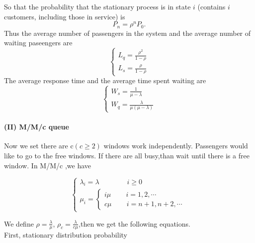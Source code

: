 \documentclass{mcmthesis}
\begin{document}
			So that the probability that the stationary process is in state ${i}$ (contains ${i}$ customers, including those in service) is
			\begin{equation}
			 	P_n = \rho ^n P_0.
			\end{equation}
			Thus the average number of passengers in the system and the average number of waiting paseengers are
				\begin{equation}    
					\left  \{
       						\begin{array}{lr}
			 				L_q = \frac {\rho ^2}{1-\rho}\\  \label{eq1}
							L_s = \frac{\rho}{1 - \rho}
  					      \end{array}
					\right.
				\end{equation}
			The average response time and the average time spent waiting are
				\begin{equation}    
					\left  \{
       						\begin{array}{lr}
       							W_s = \frac{1}{\mu - \lambda}\\   \label{eq2}
       							W_q = \frac{\lambda}{\mu (\mu - \lambda)}
  					      \end{array}
					\right.
				\end{equation}

	\paragraph{(II) M/M/c queue }%
Now we set there are c$(c\geqslant 2)$ windows work independently. Passengers would like  to go to the free windows. If there are all busy,than wait until there is a free window.
In M/M/c ,we have 
 
\begin{equation}    
\left  \{
       \begin{array}{lr}
         \lambda_i=\lambda  \qquad \qquad i\geqslant 0\\
           \mu_i=\left  \{
       \begin{array}{lr}
         i\mu  \qquad\, i=1,2,\cdots\\
            c\mu\qquad\, i=n+1,n+2,\cdots
        \end{array}
\right.
        \end{array}
\right.
\end{equation}

We define $\rho=\frac{\lambda}{\mu}$, $\rho_c=\frac{\lambda}{c\mu}$,then we get the following equations.
\\First, stationary distribution probability 
\end{document}
